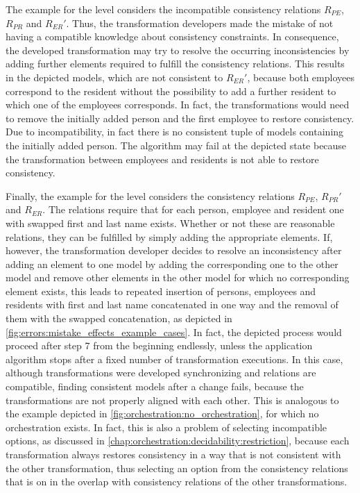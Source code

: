 The example for the \levelnetworkrelation level considers the incompatible consistency relations $R_{PE}$, $R_{PR}$ and $R_{ER}'$. Thus, the transformation developers made the mistake of not having a compatible knowledge about consistency constraints.
In consequence, the developed transformation may try to resolve the occurring inconsistencies by adding further elements required to fulfill the consistency relations.
This results in the depicted models, which are not consistent to $R_{ER}'$, because both employees correspond to the resident without the possibility to add a further resident to which one of the employees corresponds.
In fact, the transformations would need to remove the initially added person and the first employee to restore consistency.
Due to incompatibility, in fact there is no consistent tuple of models containing the initially added person.
The algorithm may fail at the depicted state because the transformation between employees and residents is not able to restore consistency.

Finally, the example for the \levelnetworkrule level considers the consistency relations $R_{PE}$, $R_{PR}'$ and $R_{ER}$.
The relations require that for each person, employee and resident one with swapped first and last name exists.
Whether or not these are reasonable relations, they can be fulfilled by simply adding the appropriate elements.
If, however, the transformation developer decides to resolve an inconsistency after adding an element to one model by adding the corresponding one to the other model and remove other elements in the other model for which no corresponding element exists, this leads to repeated insertion of persons, employees and residents with first and last name concatenated in one way and the removal of them with the swapped concatenation, as depicted in \autoref{fig:errors:mistake_effects_example_cases}.
In fact, the depicted process would proceed after step 7 from the beginning endlessly, unless the application algorithm stops after a fixed number of transformation executions.
In this case, although transformations were developed synchronizing and relations are compatible, finding consistent models after a change fails, because the transformations are not properly aligned with each other.
This is analogous to the example depicted in \autoref{fig:orchestration:no_orchestration}, for which no orchestration exists.
In fact, this is also a problem of selecting incompatible options, as discussed in \autoref{chap:orchestration:decidability:restriction}, because each transformation always restores consistency in a way that is not consistent with the other transformation, thus selecting an option from the consistency relations that is on in the overlap with consistency relations of the other transformations.

